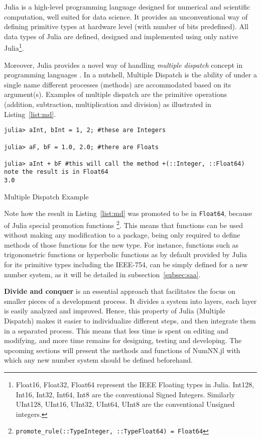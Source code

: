 Julia \cite{Julia,Bezanson2017} is a high-level programming language designed for numerical and scientific computation, well suited for data science. It provides an unconventional way of defining primitive types at hardware level (with number of bits predefined). All data types of Julia are defined, designed and implemented using only native Julia\footnote{{Float16, Float32, Float64} represent the IEEE Floating types in Julia. {Int128, Int16, Int32, Int64, Int8} are the conventional Signed Integers. Similarly {UInt128, UInt16, UInt32, UInt64, UInt8} are the conventional Unsigned integers.}.

Moreover, Julia provides a novel way of handling \emph{multiple dispatch} \cite{WikiMultipleDispatch} concept in programming languages \cite{JuliaMehtods}. In a nutshell, Multiple Dispatch is the ability of under a single name different processes (methods) are accommodated based on its argument(s). Examples of multiple dispatch are the primitive operations (addition, subtraction, multiplication and division) as illustrated in Listing~\ref{list:md}.

\begin{listing}[H]
\begin{verbatim}
julia> aInt, bInt = 1, 2; #these are Integers

julia> aF, bF = 1.0, 2.0; #there are Floats

julia> aInt + bF #this will call the method +(::Integer, ::Float64) note the result is in Float64
3.0
\end{verbatim}
\caption{Multiple Dispatch Example}\label{list:md}
\end{listing}

Note how the result in Listing~\ref{list:md} was promoted to be in \texttt{Float64}, because of Julia special promotion functions \footnote{\texttt{promote_rule(::Type{Integer}, ::Type{Float64}) = Float64}}. This means that functions can be used without making any modification to a package, being only required to define methods of those functions for the new type. For instance, functions such as trigonometric functions or hyperbolic functions as by default provided by Julia for its primitive types including the IEEE-754, can be simply defined for a new number system, as it will be detailed in subsection~\ref{subsec:saa}.

\textbf{Divide and conquer} is an essential approach that facilitates the focus on smaller pieces of a development process. It divides a system into layers, each layer is easily analyzed and improved. Hence, this property of Julia (Multiple Dispatch) makes it easier to individualize different steps, and then integrate them in a separated process. This means that less time is spent on editing and modifying, and more time remains for designing, testing and developing. The upcoming sections will present the methods and functions of NumNN.jl with which any new number system should be defined beforehand.

